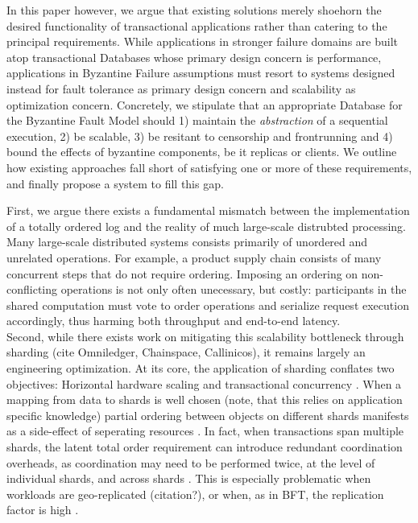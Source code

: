 In this paper however, we argue that existing solutions merely shoehorn the desired functionality of transactional applications rather than catering to the principal requirements. 
While applications in stronger failure domains are built atop transactional Databases whose primary design concern is performance, applications in Byzantine Failure assumptions must resort to systems designed instead for fault tolerance as primary design concern and scalability as optimization concern. 
Concretely, we stipulate that an appropriate Database for the Byzantine Fault Model should 1) maintain the \textit{abstraction} of a sequential execution, 2) be scalable, 3) be resitant to censorship and frontrunning and 4) bound the effects of byzantine components, be it replicas or clients.
We outline how existing approaches fall short of satisfying one or more of these requirements, and finally propose a system to fill this gap.

\iffalse
{}
First, we argue there exists a fundamental mismatch between the implementation of a totally ordered log and the reality of much large-scale distrubted processing. Many large-scale distributed systems consists primarily of unordered and unrelated operations. For example, a product supply chain consists of many concurrent steps that do not require ordering. Imposing an ordering on non-conflicting operations is not only often unecessary, but costly: participants in the shared computation must vote to order operations and serialize request execution accordingly, thus harming both throughput and end-to-end latency. \\

Second, while there exists work on mitigating this scalability bottleneck through sharding (cite Omniledger, Chainspace, Callinicos), it remains largely an engineering optimization. At its core, the application of sharding conflates two objectives: Horizontal hardware scaling and transactional concurrency . When a mapping from data to shards is well chosen (note, that this relies on application specific knowledge) partial ordering between objects on different shards manifests as a side-effect of seperating resources . In fact, when transactions span multiple shards, the latent total order requirement can introduce redundant coordination overheads, as coordination may need to be performed twice, at the level of individual shards, and across shards \cite{zhang2016operation}. This is especially problematic when workloads are geo-replicated (citation?), or when, as in BFT, the replication factor is high . \\

